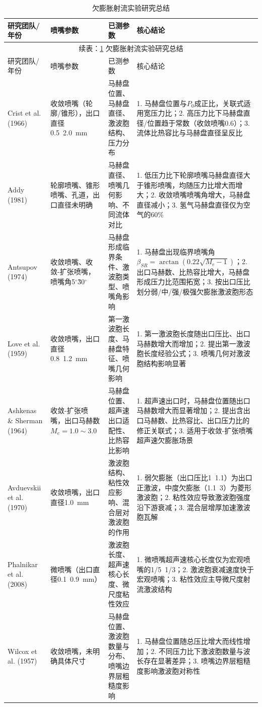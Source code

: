 \begin{longtable}{p{3.2cm} p{3.4cm} p{3.2cm} p{4.5cm}}
	\caption{欠膨胀射流实验研究总结}
	\label{tab:jet_review} \\
	\toprule
	研究团队/年份 & 喷嘴参数 & 已测参数 & 核心结论 \\
	\midrule
	\endfirsthead
	\multicolumn{4}{c}{续表：\ref{tab:jet_review} 欠膨胀射流实验研究总结} \\
	\toprule
	研究团队/年份 & 喷嘴参数 & 已测参数 & 核心结论 \\
	\midrule
	\endhead
	\bottomrule
	\endfoot
	\bottomrule
	\endlastfoot
	Crist et al. (1966) & 收敛喷嘴（轮廓/锥形），出口直径0.5~2.0~mm & 马赫盘位置、马赫盘直径、激波胞结构、压力分布 & 1. 马赫盘位置与$P_0$成正比，关联式适用宽压力比；2. 高压力比下马赫盘直径/位置趋于常数（收敛喷嘴0.6）；3. 流体比热容比与马赫盘直径呈反比 \\
	Addy (1981) & 轮廓喷嘴、锥形喷嘴、孔道，出口直径未明确 & 马赫盘直径、喷嘴几何影响、不同流体对比 & 1. 低压力比下轮廓喷嘴马赫盘直径大于锥形喷嘴，均随压力比增大而增大；2. 收敛喷嘴喷嘴角增大，马赫盘直径减小；3. 氢气马赫盘直径仅为空气的60\% \\
	Antsupov (1974) & 收敛喷嘴、收敛-扩张喷嘴，喷嘴角5$^\circ$\~30$^\circ$ & 马赫盘形成临界条件、激波胞类型、喷嘴角影响 & 1. 马赫盘出现临界喷嘴角$\beta_{SR}=\arctan(0.22\sqrt{M_e-1})$；2. 出口马赫数、比热容比增大，马赫盘形成压力比范围拓宽；3. 按出口压比划分弱/中/强/极强欠膨胀激波胞形态 \\
	Love et al. (1959) & 收敛喷嘴，出口直径0.8~1.2~mm & 第一激波胞长度、马赫盘特征、喷嘴几何影响 & 1. 第一激波胞长度随出口压比、出口马赫数增大而增加；2. 提出第一激波胞长度经验公式；3. 喷嘴几何对激波胞结构影响显著 \\
	Ashkenas \& Sherman (1964) & 收敛-扩张喷嘴，出口马赫数$M_e=1.0\sim3.0$ & 马赫盘位置、超声速出口适配性、比热容比影响 & 1. 超声速出口时，马赫盘位置随出口马赫数增大而显著增加；2. 提出含出口马赫数、比热容比、出口压力比的修正关联式；3. 适用于收敛-扩张喷嘴超声速欠膨胀场景 \\
	Avduevskii et al. (1970) & 收敛喷嘴，出口直径1.0~mm & 激波胞结构、粘性效应影响、混合层对激波胞的作用 & 1. 弱欠膨胀（出口压比1~1.1）为出口正激波，中度欠膨胀（1.1~3）为菱形激波胞；2. 粘性效应导致激波胞强度沿下游衰减；3. 混合层增厚加速激波胞瓦解 \\
	Phalnikar et al. (2008) & 微喷嘴（出口直径0.1~0.9~mm） & 激波胞长度、超声速核心长度、微尺度粘性效应 & 1. 微喷嘴超声速核心长度仅为宏观喷嘴的1/5~1/3；2. 激波胞衰减速度快于宏观喷嘴；3. 粘性效应主导微尺度射流激波结构 \\
	Wilcox et al. (1957) & 收敛喷嘴，未明确具体尺寸 & 马赫盘位置、激波胞数量与分布、喷嘴边界层粗糙度影响 & 1. 马赫盘位置随总压比增大而线性增加；2. 不同压力比下激波胞数量与波长存在显著差异；3. 喷嘴边界层粗糙度影响激波胞对称性 \\
\end{longtable}
